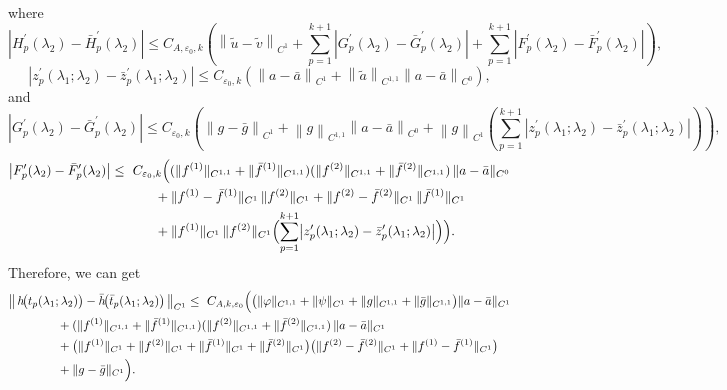 \documentclass[a4paper,reqno,11pt]{amsart}
\numberwithin{equation}{section} %
\begin{document}
where
$$
\left| H_{p}^{\prime}\left( \lambda _2 \right) -\bar{H}_{p}^{\prime}\left( \lambda _2 \right) \right|\le C_{A,\varepsilon _0,k}\left( \left\| \tilde{u}-\tilde{v} \right\| _{C^1}+\sum_{p=1}^{k+1}{\left| G_{p}^{\prime}\left( \lambda _2 \right) -\bar{G}_{p}^{\prime}\left( \lambda _2 \right) \right|}+\sum_{p=1}^{k+1}{\left| F_{p}^{\prime}\left( \lambda _2 \right) -\bar{F}_{p}^{\prime}\left( \lambda _2 \right) \right|} \right) ,
$$
$$
\left| z_{p}^{\prime}\left( \lambda _1;\lambda _2 \right) -\bar{z}_{p}^{\prime}\left( \lambda _1;\lambda _2 \right) \right|\le C_{\varepsilon _0,k}\left( \left\lVert  a-\bar{a}\right\rVert  _{C^1}+ \left\lVert \tilde{a}\right\rVert  _{C^{1,1}}\left\lVert  a-\bar{a}\right\rVert  _{C^0} \right) ,
$$
and
$$
\left| G_{p}^{\prime}\left( \lambda _2 \right) -\bar{G}_{p}^{\prime}\left( \lambda _2 \right) \right|\le C_{\varepsilon _0,k}\left( \left\| g-\bar{g} \right\| _{C^1}+\left\| g \right\| _{C^{1,1}}\left\| a-\bar{a} \right\| _{C^0}+\left\| g \right\| _{C^1}\left( \sum_{p=1}^{k+1}{\left| z_{p}^{\prime}\left( \lambda _1;\lambda _2 \right) -\bar{z}_{p}^{\prime}\left( \lambda _1;\lambda _2 \right) \right|} \right) \right) ,
$$
\[
\begin{aligned}
\bigl|F'_p(\lambda_2)-\bar F'_p(\lambda_2)\bigr|
\le{}&\ C_{\varepsilon_0,k}\Bigl(
  (\|f^{(1)}\|_{C^{1,1}}+\|\bar f^{(1)}\|_{C^{1,1}})
  (\|f^{(2)}\|_{C^{1,1}}+\|\bar f^{(2)}\|_{C^{1,1}})\,\|a-\bar a\|_{C^{0}} \\
&\qquad + \|f^{(1)}-\bar f^{(1)}\|_{C^{1}}\,\|f^{(2)}\|_{C^{1}}
  + \|f^{(2)}-\bar f^{(2)}\|_{C^{1}}\,\|\bar f^{(1)}\|_{C^{1}} \\
&\qquad + \|f^{(1)}\|_{C^{1}}\,\|f^{(2)}\|_{C^{1}}
   \Bigl(\sum_{p=1}^{k+1}\bigl|z'_p(\lambda_1;\lambda_2)-\bar z'_p(\lambda_1;\lambda_2)\bigr|\Bigr)
\Bigr).
\end{aligned}
\]
Therefore, we can get
\[
\begin{aligned}
&\bigl\|\,h\!\bigl(t_p(\lambda_1;\lambda_2)\bigr)
 - \bar h\!\bigl(\bar t_p(\lambda_1;\lambda_2)\bigr)\,\bigr\|_{C^{1}}
\le{}\ C_{A,k,\varepsilon_0}\Bigl(
   \bigl(\|\varphi\|_{C^{1,1}}+\|\psi\|_{C^{1}}
     + \|g\|_{C^{1,1}}+\|\bar g\|_{C^{1,1}}\bigr) \|a-\bar a\|_{C^{1}}
\\
&\qquad \qquad
     + (\|f^{(1)}\|_{C^{1,1}}+\|\bar f^{(1)}\|_{C^{1,1}})
       (\|f^{(2)}\|_{C^{1,1}}+\|\bar f^{(2)}\|_{C^{1,1}})\,
    \|a-\bar a\|_{C^{1}}
\\
&\qquad \qquad
  + \bigl(\|f^{(1)}\|_{C^{1}}+\|f^{(2)}\|_{C^{1}}
       +\|\bar f^{(1)}\|_{C^{1}}+\|\bar f^{(2)}\|_{C^{1}}\bigr)
  \bigl(\|f^{(2)}-\bar f^{(2)}\|_{C^{1}}
       +\|f^{(1)}-\bar f^{(1)}\|_{C^{1}}\bigr)
\\
&\qquad \qquad
  + \|g-\bar g\|_{C^{1}}
\Bigr).
\end{aligned}
\]
\end{document}
